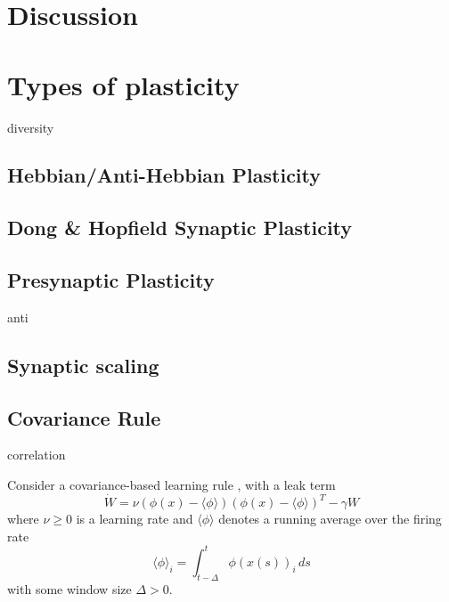 \documentclass{article}
\theoremstyle{definition} \newtheorem{definition}{Definition}
\theoremstyle{remark} \newtheorem{remark}{Remark}
\newcounter{ct}
\begin{document}
\section{Discussion}




\newpage
%




\newpage
\appendix

\section{Types of plasticity}
diversity\citep{zenke2015diverse}

\subsection{Hebbian/Anti-Hebbian Plasticity}
\subsection{Dong \& Hopfield Synaptic Plasticity}
\subsection{Presynaptic Plasticity}
\citep{mongillo2008synaptic}
\citep{masse2019circuit}

anti \citep{magnasco2009self}

\subsection{Synaptic scaling}
\citep{renart2003robust}

\subsection{Covariance Rule}
correlation\citep{bi2001synaptic}

\citep{amit1989modeling}
Consider a covariance-based learning rule \citep{sejnowski1989hebb, gerstner2002mathematical}, with a leak term  
\begin{equation}
    \dot{W} = \nu \left( \phi(x) - \langle \phi \rangle \right) \left( \phi(x) - \langle \phi \rangle \right)^T - \gamma W
\end{equation}
where $\nu \geq 0$ is a learning rate and $\langle \phi \rangle$ denotes a running average over the firing rate  
\begin{equation}
    \langle \phi \rangle_i = \int_{t-\Delta}^{t} \phi(x(s))_i \, ds
\end{equation}
with some window size $\Delta > 0$.
\end{document}
